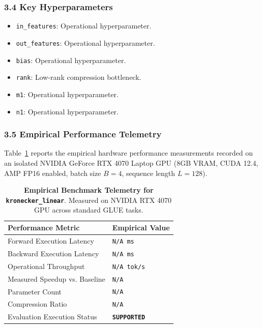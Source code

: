\subsubsection*{3.4 Key Hyperparameters}
\begin{itemize}
    \item \texttt{in\_features}: Operational hyperparameter.
    \item \texttt{out\_features}: Operational hyperparameter.
    \item \texttt{bias}: Operational hyperparameter.
    \item \texttt{rank}: Low-rank compression bottleneck.
    \item \texttt{m1}: Operational hyperparameter.
    \item \texttt{n1}: Operational hyperparameter.
\end{itemize}

\subsubsection*{3.5 Empirical Performance Telemetry}
Table~\ref{tab:telemetry_kronecker\_linear} reports the empirical hardware performance measurements recorded on an isolated NVIDIA GeForce RTX 4070 Laptop GPU (8GB VRAM, CUDA 12.4, AMP FP16 enabled, batch size $B=4$, sequence length $L=128$).

\begin{table}[h]
\centering
\small
\caption{\textbf{Empirical Benchmark Telemetry for \texttt{kronecker\_linear}}. Measured on NVIDIA RTX 4070 GPU across standard GLUE tasks.}
\label{tab:telemetry_kronecker\_linear}
\begin{tabularx}{\columnwidth}{lX}
\toprule
\textbf{Performance Metric} & \textbf{Empirical Value} \\
\midrule
Forward Execution Latency & \texttt{N/A ms} \\
Backward Execution Latency & \texttt{N/A ms} \\
Operational Throughput & \texttt{N/A tok/s} \\
Measured Speedup vs. Baseline & \texttt{N/A} \\
Parameter Count & \texttt{N/A} \\
Compression Ratio & \texttt{N/A} \\
Evaluation Execution Status & \textbf{\texttt{SUPPORTED}} \\
\bottomrule
\end{tabularx}
\end{table}

